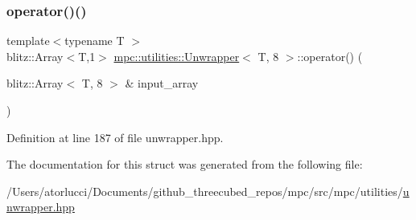 \subsubsection{\texorpdfstring{operator()()}{operator()()}}
{\footnotesize\ttfamily template$<$typename T $>$ \\
blitz\+::\+Array$<$T,1$>$ \mbox{\hyperlink{structmpc_1_1utilities_1_1_unwrapper}{mpc\+::utilities\+::\+Unwrapper}}$<$ T, 8 $>$\+::operator() (\begin{DoxyParamCaption}\item[{blitz\+::\+Array$<$ T, 8 $>$ \&}]{input\+\_\+array }\end{DoxyParamCaption})\hspace{0.3cm}{\ttfamily [inline]}}



Definition at line 187 of file unwrapper.\+hpp.



The documentation for this struct was generated from the following file\+:\begin{DoxyCompactItemize}
\item 
/\+Users/atorlucci/\+Documents/github\+\_\+threecubed\+\_\+repos/mpc/src/mpc/utilities/\mbox{\hyperlink{unwrapper_8hpp}{unwrapper.\+hpp}}\end{DoxyCompactItemize}
